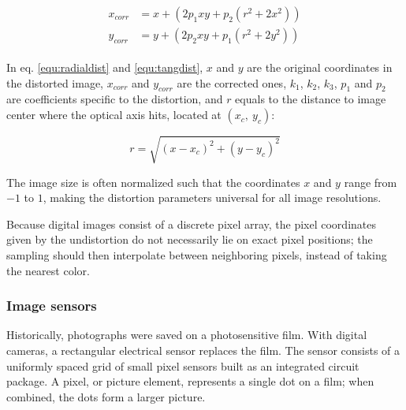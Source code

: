 \begin{align} \label{equ:tangdist} \begin{split}
x_{corr} &= x + (2 p_1 x y + p_2 (r^2 + 2 x^2))\\
y_{corr} &= y + (2 p_2 x y + p_1 (r^2 + 2 y^2))
\end{split} \end{align}

In eq. \ref{equ:radialdist} and \ref{equ:tangdist}, $x$ and $y$ are the original coordinates in the distorted image, $x_{corr}$ and $y_{corr}$ are the corrected ones, $k_1$, $k_2$, $k_3$, $p_1$ and $p_2$ are coefficients specific to the distortion, and $r$ equals to the distance to image center where the optical axis hits, located at $(x_c,~y_c)$:

\begin{equation}
r = \sqrt{(x - x_c)^2 + (y - y_c)^2}
\end{equation}

The image size is often normalized such that the coordinates $x$ and $y$ range from $-1$ to $1$, making the distortion parameters universal for all image resolutions.

Because digital images consist of a discrete pixel array, the pixel coordinates given by the undistortion do not necessarily lie on exact pixel positions;
the sampling should then interpolate between neighboring pixels, instead of taking the nearest color.





\subsubsection{Image sensors} %


Historically, photographs were saved on a photosensitive film.
With digital cameras, a rectangular electrical sensor replaces the film.
The sensor consists of a uniformly spaced grid of small pixel sensors built as an integrated circuit package.
A pixel, or picture element, represents a single dot on a film; when combined, the dots form a larger picture.

